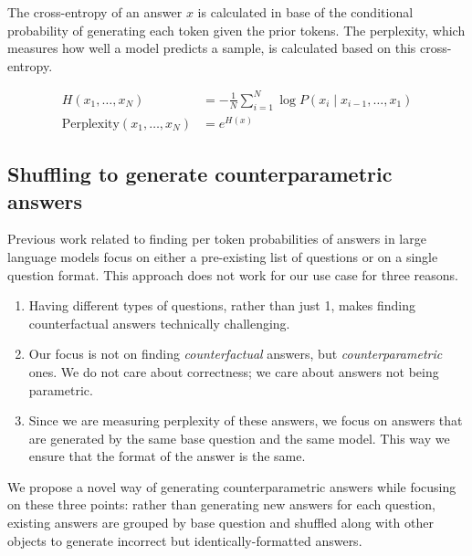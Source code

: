 The cross-entropy of an answer $x$ is calculated in base of the conditional probability of generating each token given the prior tokens.
The perplexity, which measures how well a model predicts a sample, is calculated based on this cross-entropy.

\begin{equation}
	\begin{aligned}
		H \left( x_1, \dots, x_N \right) &= - \frac{1}{N} \sum^N_{i = 1} \log P \left( x_i \mid x_{i - 1}, \dots, x_1 \right) \\
		\text{Perplexity} \left( x_1, \dots, x_N \right) &= e^{H(x)}
	\end{aligned}
\end{equation}

\subsection{Shuffling to generate counterparametric answers}

Previous work related to finding per token probabilities of answers in large language models focus on either a pre-existing list of questions or on a single question format\cite{factual_recall}.
This approach does not work for our use case for three reasons.
\begin{enumerate}
	\item Having \baseqs{} different types of questions, rather than just 1, makes finding counterfactual answers technically challenging.
	\item Our focus is not on finding \emph{counterfactual} answers, but \emph{counterparametric} ones.
		We do not care about correctness; we care about answers not being parametric.
	\item Since we are measuring perplexity of these answers, we focus on answers that are generated by the same base question and the same model.
		This way we ensure that the format of the answer is the same.
\end{enumerate}

We propose a novel way of generating counterparametric answers while focusing on these three points: rather than generating new answers for each question, existing answers are grouped by base question and shuffled along with other objects to generate incorrect but identically-formatted answers.

